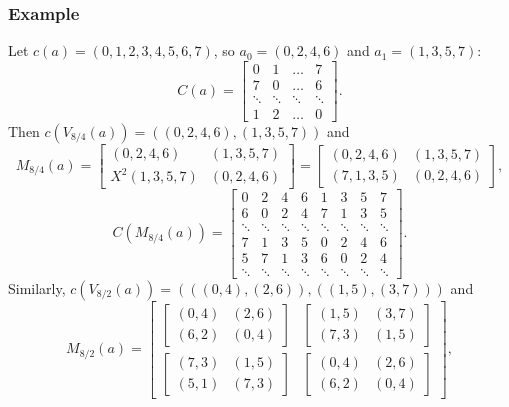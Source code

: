 \subsubsection{Example}

Let $c(a) = (0,1,2,3,4,5,6,7)$, so $a_0 = (0,2,4,6)$ and $a_1 = (1,3,5,7)$:
\[
	C(a) = \begin{bmatrix}
		0 & 1 & \dots & 7 \\
		7 & 0 & \dots & 6 \\
		\ddots & \ddots & \ddots & \ddots \\
		1 & 2 & \dots & 0
	\end{bmatrix}.
\]
Then $c(V_{8/4}(a)) = ((0,2,4,6),(1,3,5,7))$ and
\[
	M_{8/4}(a) = \begin{bmatrix}
		(0,2,4,6) & (1,3,5,7) \\
		X^2(1,3,5,7) & (0,2,4,6)
	\end{bmatrix}
	=
	\begin{bmatrix}
		(0,2,4,6) & (1,3,5,7) \\
		(7,1,3,5) & (0,2,4,6)
	\end{bmatrix},
\]
\[
	C(M_{8/4}(a)) = \begin{bmatrix}
		0 & 2 & 4 & 6 & 1 & 3 & 5 & 7 \\
		6 & 0 & 2 & 4 & 7 & 1 & 3 & 5 \\
		\ddots & \ddots & \ddots & \ddots & \ddots & \ddots & \ddots & \ddots \\
		7 & 1 & 3 & 5 & 0 & 2 & 4 & 6 \\
		5 & 7 & 1 & 3 & 6 & 0 & 2 & 4 \\
		\ddots & \ddots & \ddots & \ddots & \ddots & \ddots & \ddots & \ddots
	\end{bmatrix}.
\]
Similarly, $c(V_{8/2}(a)) = (((0,4),(2,6)),((1,5),(3,7)))$ and
\[
	M_{8/2}(a) =
	\begin{bmatrix}
		\begin{bmatrix} (0,4) & (2,6) \\ (6,2) & (0,4) \end{bmatrix} &
		\begin{bmatrix} (1,5) & (3,7) \\ (7,3) & (1,5) \end{bmatrix} \\[1em]
		\begin{bmatrix} (7,3) & (1,5) \\ (5,1) & (7,3) \end{bmatrix} &
		\begin{bmatrix} (0,4) & (2,6) \\ (6,2) & (0,4) \end{bmatrix}
	\end{bmatrix},
\]
